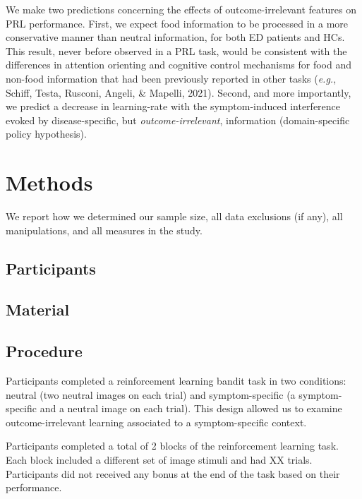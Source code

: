 \documentclass[
  man,floatsintext]{apa6}
\begin{document}
We make two predictions concerning the effects of outcome-irrelevant features on PRL performance. First, we expect food information to be processed in a more conservative manner than neutral information, for both ED patients and HCs. This result, never before observed in a PRL task, would be consistent with the differences in attention orienting and cognitive control mechanisms for food and non-food information that had been previously reported in other tasks (\emph{e.g.}, Schiff, Testa, Rusconi, Angeli, \& Mapelli, 2021). Second, and more importantly, we predict a decrease in learning-rate with the symptom-induced interference evoked by disease-specific, but \emph{outcome-irrelevant}, information (domain-specific policy hypothesis).

\hypertarget{methods}{%
\section{Methods}\label{methods}}

We report how we determined our sample size, all data exclusions (if any), all manipulations, and all measures in the study.

\hypertarget{participants}{%
\subsection{Participants}\label{participants}}

\hypertarget{material}{%
\subsection{Material}\label{material}}

\hypertarget{procedure}{%
\subsection{Procedure}\label{procedure}}

Participants completed a reinforcement learning bandit task in two conditions: neutral (two neutral images on each trial) and symptom-specific (a symptom-specific and a neutral image on each trial). This design allowed us to examine outcome-irrelevant learning associated to a symptom-specific context.

Participants completed a total of 2 blocks of the reinforcement learning task. Each block included a different set of image stimuli and had XX trials. Participants did not received any bonus at the end of the task based on their performance.
\end{document}
